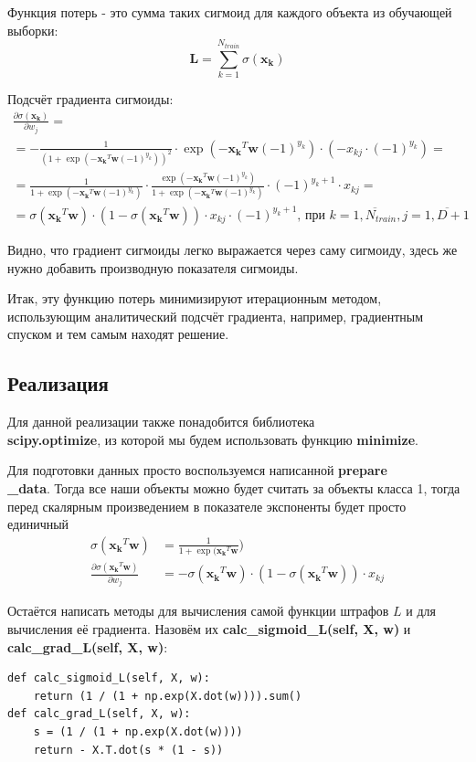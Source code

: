 \documentclass[a4paper]{article}
\newcommand{\w}{\bm{w}}
\newcommand{\yk}{y_k}
\newcommand{\xk}{\bm{x_k}}
\newcommand{\xkj}{x_{kj}}
\begin{document}
Функция потерь - это сумма таких сигмоид для каждого объекта из обучающей выборки:
\begin{equation}
\bm{L} = \sum_{k = 1}^{N_{train}}\sigma(\xk)
\end{equation}

Подсчёт градиента сигмоиды: 
\begin{multline*}
\frac{\partial \sigma(\xk)}{\partial w_j} = \\ = - \frac{1}{(1 + \exp(-\xk^T\w(-1)^{\yk}))^2} \cdot \exp(-\xk^T\w(-1)^{\yk}) \cdot (-\xkj\cdot(-1)^{\yk})=  \\ =
\frac{1}{1 + \exp(-\xk^T\w(-1)^{\yk})} \cdot \frac{\exp(-\xk^T\w(-1)^{\yk})}{1 + \exp(-\xk^T\w(-1)^{\yk})} \cdot (-1)^{\yk + 1} \cdot \xkj = \\ =
\sigma(\xk^T\w) \cdot (1 - \sigma(\xk^T\w)) \cdot \xkj \cdot (-1)^{\yk + 1} \text{, при } k = \overline{1, N_{train}}, j = \overline{1, D + 1}
\end{multline*}

Видно, что градиент сигмоиды легко выражается через саму сигмоиду, здесь же нужно добавить производную показателя сигмоиды.

Итак, эту функцию потерь минимизируют итерационным методом, использующим аналитический подсчёт градиента, например, градиентным спуском и тем самым находят решение.
\subsection{Реализация}
Для данной реализации также понадобится библиотека\\ \textbf{scipy.optimize}, из которой мы будем использовать функцию \textbf{minimize}.

Для подготовки данных просто воспользуемся написанной \textbf{prepare\\\_data}. Тогда все наши объекты можно будет считать за объекты класса 1, тогда перед скалярным произведением в показателе экспоненты будет просто единичный 
\begin{align*}
\sigma(\xk^T\w) & = \frac{1}{1 + \exp(\xk^T\w})\\
\frac{\partial \sigma(\xk^T\w)}{\partial w_j} & = - \sigma(\xk^T\w) \cdot (1 - \sigma(\xk^T\w)) \cdot \xkj 
\end{align*}

Остаётся написать методы для вычисления самой функции штрафов $L$ и для вычисления её градиента. Назовём их \textbf{calc\_sigmoid\_L(self, X, w)} и \textbf{calc\_grad\_L(self, X, w)}:
\begin{lstlisting}
def calc_sigmoid_L(self, X, w):
	return (1 / (1 + np.exp(X.dot(w)))).sum()
def calc_grad_L(self, X, w):
	s = (1 / (1 + np.exp(X.dot(w))))
	return - X.T.dot(s * (1 - s))
\end{lstlisting}
\end{document}
